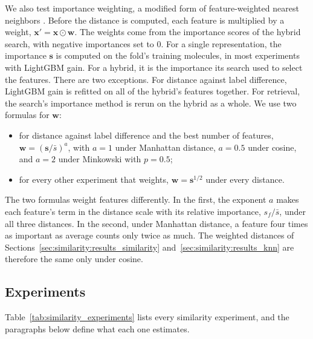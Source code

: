 We also test importance weighting, a modified form of feature-weighted nearest neighbors \citep{Wettschereck1997}. Before the distance is computed, each feature is multiplied by a weight, $\mathbf{x}' = \mathbf{x} \odot \mathbf{w}$. The weights come from the importance scores of the hybrid search, with negative importances set to 0. For a single representation, the importance $\mathbf{s}$ is computed on the fold's training molecules, in most experiments with LightGBM gain. For a hybrid, it is the importance its search used to select the features. There are two exceptions. For distance against label difference, LightGBM gain is refitted on all of the hybrid's features together. For retrieval, the search's importance method is rerun on the hybrid as a whole. We use two formulas for $\mathbf{w}$:
\begin{itemize}
    \item for distance against label difference and the best number of features, $\mathbf{w} = (\mathbf{s}/\bar{s})^{a}$, with $a = 1$ under Manhattan distance, $a = 0.5$ under cosine, and $a = 2$ under Minkowski with $p = 0.5$;
    \item for every other experiment that weights, $\mathbf{w} = \mathbf{s}^{1/2}$ under every distance.
\end{itemize}
The two formulas weight features differently. In the first, the exponent $a$ makes each feature's term in the distance scale with its relative importance, $s_f/\bar{s}$, under all three distances. In the second, under Manhattan distance, a feature four times as important as average counts only twice as much. The weighted distances of Sections~\ref{sec:similarity:results_similarity} and~\ref{sec:similarity:results_knn} are therefore the same only under cosine.

\subsection{Experiments}\label{sec:similarity:experiments}

Table~\ref{tab:similarity_experiments} lists every similarity experiment, and the paragraphs below define what each one estimates.

